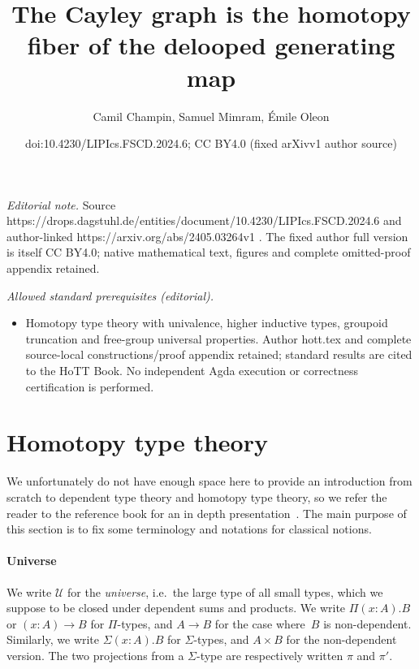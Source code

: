 \documentclass[10pt,a4paper]{amsart}
\title{The Cayley graph is the homotopy fiber of the delooped generating map}
\author{Camil Champin, Samuel Mimram, Émile Oleon}
\date{doi:10.4230/LIPIcs.FSCD.2024.6; CC BY4.0 (fixed arXivv1 author source)}
\theoremstyle{definition}
\newcommand{\fst}{\pi}
\newcommand{\snd}{\pi'}
\newcommand{\U}{\mathcal{U}} %
\newcommand{\ie}{i.e.~}
\begin{document}
\maketitle
\setcounter{section}{1}
\noindent\textit{Editorial note.} Source https://drops.dagstuhl.de/entities/document/10.4230/LIPIcs.FSCD.2024.6 and author-linked https://arxiv.org/abs/2405.03264v1 . The fixed author full version is itself CC BY4.0; native mathematical text, figures and complete omitted-proof appendix retained.\par\medskip
\noindent\textit{Allowed standard prerequisites (editorial).}\begin{itemize}
\item Homotopy type theory with univalence, higher inductive types, groupoid truncation and free-group universal properties. Author hott.tex and complete source-local constructions/proof appendix retained; standard results are cited to the HoTT Book. No independent Agda execution or correctness certification is performed.
\end{itemize}\medskip
\section{Homotopy type theory}
\label{hott}
We unfortunately do not have enough space here to provide an introduction from
scratch to dependent type theory and homotopy type theory, so we refer the reader
to the reference book for an in depth presentation~\cite{hottbook}. The main
purpose of this section is to fix some terminology and notations for classical
notions.

\paragraph{Universe}
We write $\U$ for the \emph{universe}, \ie the large type of all small types,
which we suppose to be closed under dependent sums and products. We write
$\Pi(x:A).B$ or $(x:A)\to B$ for $\Pi$-types, and $A\to B$ for the case
where~$B$ is non-dependent. Similarly, we write $\Sigma(x:A).B$ for
$\Sigma$-types, and $A\times B$ for the non-dependent version. The two
projections from a $\Sigma$-type are respectively written $\fst$ and $\snd$.
\end{document}
